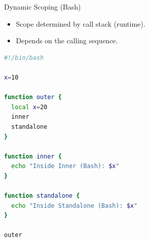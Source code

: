 \documentclass{beamer}
\begin{document}
\begin{frame}[fragile]{Dynamic Scoping (Bash)}
  \begin{itemize}
    \item Scope determined by call stack (runtime).
    \item Depends on the calling sequence.
  \end{itemize}
  \begin{lstlisting}[language=bash]
#!/bin/bash

x=10

function outer {
  local x=20
  inner
  standalone
}

function inner {
  echo "Inside Inner (Bash): $x"
}

function standalone {
  echo "Inside Standalone (Bash): $x"
}

outer
  \end{lstlisting}
\end{frame}



\end{document}
